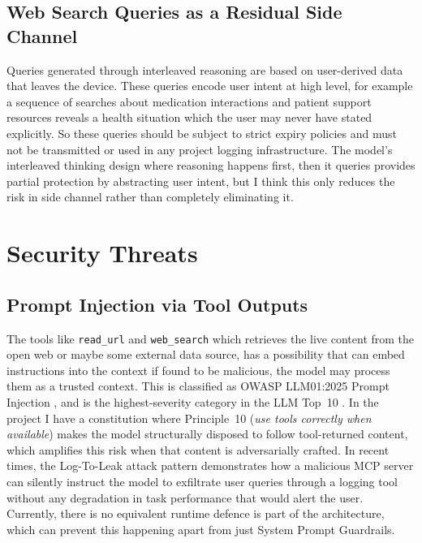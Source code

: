 \documentclass[11pt,a4paper]{article}
\begin{document}
\subsection{Web Search Queries as a Residual Side Channel}

Queries generated through interleaved reasoning are based on user-derived data that leaves the device. These queries encode user intent at high level, for example a sequence of searches about medication interactions and patient support resources reveals a health situation which the user may never have stated explicitly. So these queries should be subject to strict expiry policies and must not be transmitted or used in any project logging infrastructure. The model's interleaved thinking design where reasoning happens first, then it queries provides partial protection by abstracting user intent, but I think this only reduces the risk in side channel rather than completely eliminating it.

\section{Security Threats}
\label{sec:security}

\subsection{Prompt Injection via Tool Outputs}

The tools like \texttt{read\_url} and \texttt{web\_search} which retrieves the live content from the open web or maybe some external data source, has a possibility that can embed instructions into the context if found to be malicious, the model may process them as a trusted context. This is classified as OWASP LLM01:2025 Prompt Injection \cite{owasp2025}, and is the highest-severity category in the LLM Top~10 \cite{perez2022}. In the project I have a constitution where Principle~10 (\textit{use tools correctly when available}) makes the model structurally disposed to follow tool-returned content, which amplifies this risk when that content is adversarially crafted. In recent times, the Log-To-Leak attack pattern \cite{logtoleak} demonstrates how a malicious MCP server can silently instruct the model to exfiltrate user queries through a logging tool without any degradation in task performance that would alert the user. Currently, there is no equivalent runtime defence is part of the architecture, which can prevent this happening apart from just System Prompt Guardrails.
\end{document}
